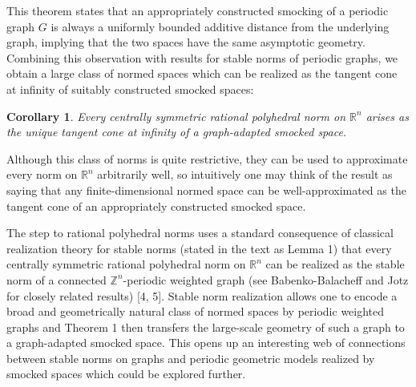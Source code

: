\documentclass[12pt, letterpaper]{article}
\newtheorem{corollary}{Corollary}
\begin{document}
\noindent
This theorem states that an appropriately constructed smocking of a periodic graph $G$ is always a uniformly bounded additive distance from the underlying graph, implying that the two spaces have the same asymptotic geometry.  Combining this observation with results for stable norms of periodic graphs, we obtain a large class of normed spaces which can be realized as the tangent cone at infinity of suitably constructed smocked spaces:
 
  





 \begin{corollary}
\label{cor:polyhedral}
 Every centrally symmetric rational polyhedral norm on $\mathbb{R}^n$ arises as the unique tangent cone at infinity of a
graph-adapted smocked space.

\end{corollary}



 
 \noindent
Although this class of norms is quite restrictive, they can be used to approximate every norm on $\mathbb{R}^n$ arbitrarily well, so intuitively one may think of the result as saying that any finite-dimensional normed space can be well-approximated as the tangent cone of an appropriately constructed smocked space.   

The step to rational polyhedral norms uses a standard consequence of classical realization theory for stable norms (stated in the text as Lemma 1) that every centrally symmetric rational polyhedral norm on $\mathbb{R}^n$ can be realized as the stable norm of a connected $\mathbb{Z}^n$-periodic weighted graph (see Babenko-Balacheff and Jotz for closely related results) [4, 5].  Stable norm realization allows one to encode a broad and geometrically natural class of normed spaces by periodic weighted graphs and Theorem 1 then transfers the large-scale geometry of such a graph to a graph-adapted smocked space.  This opens up an interesting web of connections between stable norms on graphs and periodic geometric models realized by smocked spaces which could be explored further.  
\end{document}
